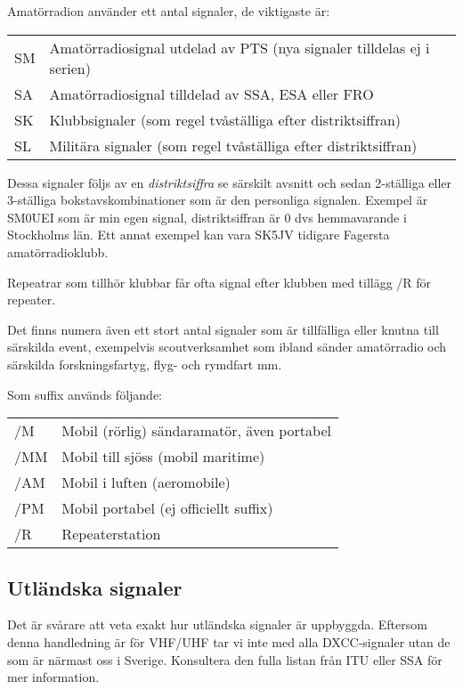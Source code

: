 Amatörradion använder ett antal signaler, de viktigaste är:

\begin{tabular}{ll}
	SM & Amatörradiosignal utdelad av PTS (nya signaler tilldelas ej i serien) \\
	SA & Amatörradiosignal tilldelad av SSA, ESA eller FRO                     \\
	SK & Klubbsignaler (som regel tvåställiga efter distriktsiffran)           \\
	SL & Militära signaler (som regel tvåställiga efter distriktsiffran)
\end{tabular}

Dessa signaler följs av en \textit{distriktsiffra} se särskilt avsnitt och sedan 2-ställiga eller 3-ställiga bokstavskombinationer som är den personliga signalen. Exempel är SM0UEI som är min egen signal, distriktsiffran är 0 dvs hemmavarande i Stockholms län. Ett annat exempel kan vara SK5JV tidigare Fagersta amatörradioklubb.

Repeatrar som tillhör klubbar får ofta signal efter klubben med tillägg /R för repeater.

Det finns numera även ett stort antal signaler som är tillfälliga eller knutna till särskilda event, exempelvis scoutverksamhet som ibland sänder amatörradio och särskilda forskningsfartyg, flyg- och rymdfart mm.

Som suffix används följande:

\begin{tabular}{ll}
	/M  & Mobil (rörlig) sändaramatör, även portabel \\
	/MM & Mobil till sjöss (mobil maritime)          \\
	/AM & Mobil i luften (aeromobile)                \\
	/PM & Mobil portabel (ej officiellt suffix)\\
	/R  & Repeaterstation
\end{tabular}

\subsection{Utländska signaler}

Det är svårare att veta exakt hur utländska signaler är uppbyggda. Eftersom denna handledning är för VHF/UHF tar vi inte med alla DXCC-signaler utan de som är närmast oss i Sverige. Konsultera den fulla listan från ITU eller SSA för mer information.

